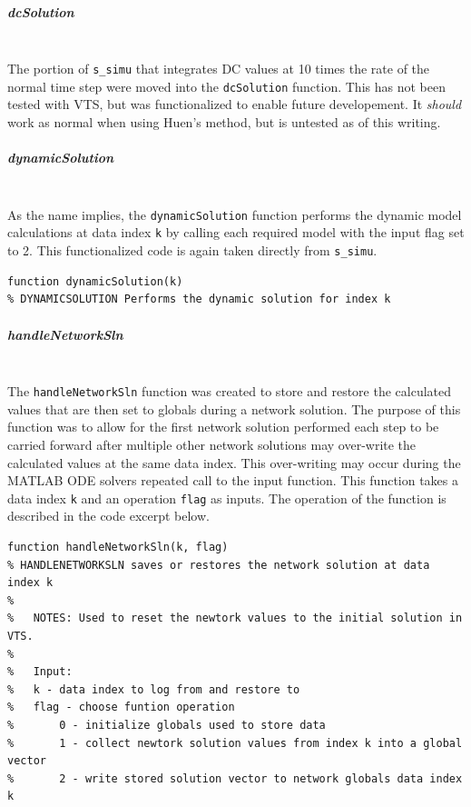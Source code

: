 \documentclass[12pt]{article}
\begin{document}
\subparagraph{dcSolution} \ \\
The portion of \verb|s_simu| that integrates DC values at 10 times the rate of the normal time step were moved into the \verb|dcSolution| function.
This has not been tested with VTS, but was functionalized to enable future developement.
It \emph{should} work as normal when using Huen's method, but is untested as of this writing.

\subparagraph{dynamicSolution} \ \\
As the name implies, the \verb|dynamicSolution| function performs the dynamic model calculations at data index \verb|k| by calling each required model with the input flag set to 2.
This functionalized code is again taken directly from \verb|s_simu|.


\begin{verbatim}
function dynamicSolution(k)
% DYNAMICSOLUTION Performs the dynamic solution for index k
\end{verbatim}

\subparagraph{handleNetworkSln} \ \\
The \verb|handleNetworkSln| function was created to store and restore the calculated values that are then set to globals during a network solution.
The purpose of this function was to allow for the first network solution performed each step to be carried forward after multiple other network solutions may over-write the calculated values at the same data index.
This over-writing may occur during the MATLAB ODE solvers repeated call to the input function.
This function takes a data index \verb|k| and an operation \verb|flag| as inputs.
The operation of the function is described in the code excerpt below.
\begin{verbatim}
function handleNetworkSln(k, flag)
% HANDLENETWORKSLN saves or restores the network solution at data index k
%
%   NOTES: Used to reset the newtork values to the initial solution in VTS.
%
%   Input:
%   k - data index to log from and restore to
%   flag - choose funtion operation
%       0 - initialize globals used to store data
%       1 - collect newtork solution values from index k into a global vector
%       2 - write stored solution vector to network globals data index k
\end{verbatim}
\end{document}
